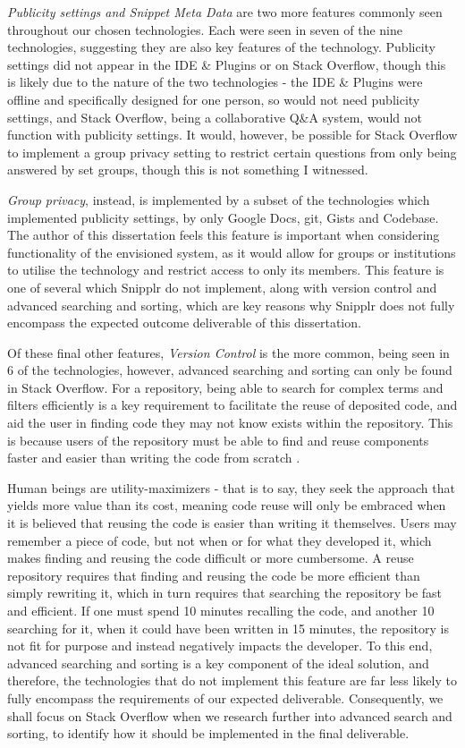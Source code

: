 \textit{Publicity settings and Snippet Meta Data} are two more features commonly seen throughout our chosen technologies. Each were seen in seven of the nine technologies, suggesting they are also key features of the technology. Publicity settings did not appear in the IDE \& Plugins or on Stack Overflow, though this is likely due to the nature of the two technologies - the IDE \& Plugins were offline and specifically designed for one person, so would not need publicity settings, and Stack Overflow, being a collaborative Q\&A system, would not function with publicity settings. It would, however, be possible for Stack Overflow to implement a group privacy setting to restrict certain questions from only being answered by set groups, though this is not something I witnessed.

\textit{Group privacy}, instead, is implemented by a subset of the technologies which implemented publicity settings, by only Google Docs, git, Gists and Codebase. The author of this dissertation feels this feature is important when considering functionality of the envisioned system, as it would allow for groups or institutions to utilise the technology and restrict access to only its members. This feature is one of several which Snipplr do not implement, along with version control and advanced searching and sorting, which are key reasons why Snipplr does not fully encompass the expected outcome deliverable of this dissertation.

Of these final other features, \textit{Version Control} is the more common, being seen in 6 of the technologies, however, advanced searching and sorting can only be found in Stack Overflow. For a repository, being able to search for complex terms and filters efficiently is a key requirement to facilitate the reuse of deposited code, and aid the user in finding code they may not know exists within the repository. This is because users of the repository must be able to find and reuse components faster and easier than writing the code from scratch \cite{Krueger1992}. 

Human beings are utility-maximizers \cite{Cognition1997} - that is to say, they seek the approach that yields more value than its cost, meaning code reuse will only be embraced when it is believed that reusing the code is easier than writing it themselves. Users may remember a piece of code, but not when or for what they developed it, which makes finding and reusing the code difficult or more cumbersome. A reuse repository requires that finding and reusing the code be more efficient than simply rewriting it, which in turn requires that searching the repository be fast and efficient. If one must spend 10 minutes recalling the code, and another 10 searching for it, when it could have been written in 15 minutes, the repository is not fit for purpose and instead negatively impacts the developer. To this end, advanced searching and sorting is a key component of the ideal solution, and therefore, the technologies that do not implement this feature are far less likely to fully encompass the requirements of our expected deliverable. Consequently, we shall focus on Stack Overflow when we research further into advanced search and sorting, to identify how it should be implemented in the final deliverable.


